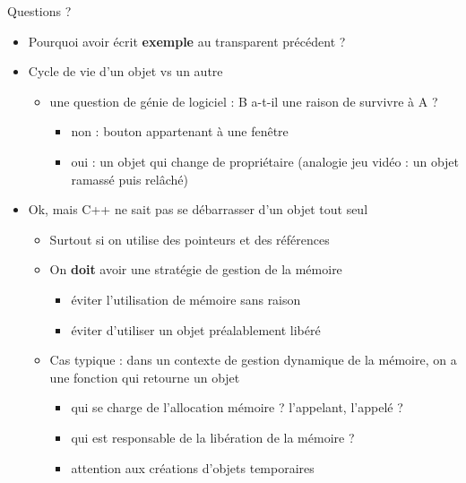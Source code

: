 \begin{frame}{Questions ?}

\begin{itemize}
\itemsep1pt\parskip0pt
\item
  Pourquoi avoir écrit \textbf{exemple} au transparent précédent ?
\item
  Cycle de vie d'un objet vs un autre

  \begin{itemize}
  \itemsep1pt\parskip0pt
  \item
    une question de génie de logiciel : B a-t-il une raison de survivre
    à A ?

    \begin{itemize}
    \itemsep1pt\parskip0pt
    \item
      non : bouton appartenant à une fenêtre
    \item
      oui : un objet qui change de propriétaire (analogie jeu vidéo : un
      objet ramassé puis relâché)
    \end{itemize}
  \end{itemize}
\item
  Ok, mais C++ ne sait pas se débarrasser d'un objet tout seul

  \begin{itemize}
  \itemsep1pt\parskip0pt
  \item
    Surtout si on utilise des pointeurs et des références
  \item
    On \textbf{doit} avoir une stratégie de gestion de la mémoire

    \begin{itemize}
    \itemsep1pt\parskip0pt
    \item
      éviter l'utilisation de mémoire sans raison
    \item
      éviter d'utiliser un objet préalablement libéré
    \end{itemize}
  \item
    Cas typique : dans un contexte de gestion dynamique de la mémoire,
    on a une fonction qui retourne un objet

    \begin{itemize}
    \itemsep1pt\parskip0pt
    \item
      qui se charge de l'allocation mémoire ? l'appelant, l'appelé ?
    \item
      qui est responsable de la libération de la mémoire ?
    \item
      attention aux créations d'objets temporaires
    \end{itemize}
  \end{itemize}
\end{itemize}

\end{frame}

